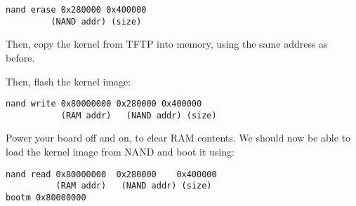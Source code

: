 \begin{verbatim}
nand erase 0x280000 0x400000
         (NAND addr) (size)
\end{verbatim}

Then, copy the kernel from TFTP into memory, using the same address as
before.

Then, flash the kernel image:

\begin{verbatim}
nand write 0x80000000 0x280000 0x400000
           (RAM addr)   (NAND addr) (size)
\end{verbatim}

Power your board off and on, to clear RAM contents. We should now be able to load
the kernel image from NAND and boot it using:

\begin{verbatim}
nand read 0x80000000  0x280000    0x400000
          (RAM addr)   (NAND addr) (size)
bootm 0x80000000
\end{verbatim}

